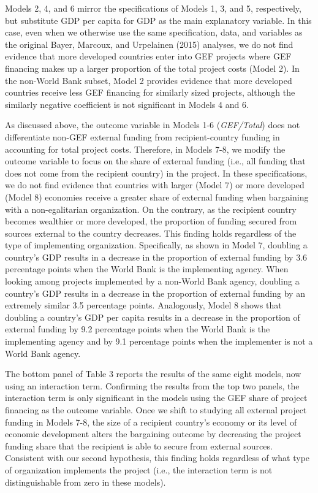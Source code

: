 \documentclass{article}
\begin{document}
Models 2, 4, and 6 mirror the specifications of Models 1, 3, and 5, respectively, but substitute GDP per capita for GDP as the main explanatory variable.  In this case, even when we otherwise use the same specification, data, and variables as the original Bayer, Marcoux, and Urpelainen (2015) analyses, we do not find evidence that more developed countries enter into GEF projects where GEF financing makes up a larger proportion of the total project costs (Model 2).  In the non-World Bank subset, Model 2 provides evidence that more developed countries receive less GEF financing for similarly sized projects, although the similarly negative coefficient is not significant in Models 4 and 6. 

As discussed above, the outcome variable in Models 1-6 (\textit{GEF/Total}) does not differentiate non-GEF external funding from recipient-country funding in accounting for total project costs.  Therefore, in Models 7-8, we modify the outcome variable to focus on the share of external funding (i.e., all funding that does not come from the recipient country) in the project.  In these specifications, we do not find evidence that countries with larger (Model 7) or more developed (Model 8) economies receive a greater share of external funding when bargaining with a non-egalitarian organization.  On the contrary, as the recipient country becomes wealthier or more developed, the proportion of funding secured from sources external to the country decreases.  This finding holds regardless of the type of implementing organization.  Specifically, as shown in Model 7, doubling a country’s GDP results in a decrease in the proportion of external funding by 3.6 percentage points when the World Bank is the implementing agency. When looking among projects implemented by a non-World Bank agency, doubling a country’s GDP results in a decrease in the proportion of external funding by an extremely similar 3.5 percentage points.  Analogously, Model 8 shows that doubling a country’s GDP per capita results in a decrease in the proportion of external funding by 9.2 percentage points when the World Bank is the implementing agency and by 9.1 percentage points when the implementer is not a World Bank agency.  

The bottom panel of Table 3 reports the results of the same eight models, now using an interaction term.  Confirming the results from the top two panels, the interaction term is only significant in the models using the GEF share of project financing as the outcome variable.  Once we shift to studying all external project funding in Models 7-8, the size of a recipient country’s economy or its level of economic development alters the bargaining outcome by decreasing the project funding share that the recipient is able to secure from external sources.  Consistent with our second hypothesis, this finding holds regardless of what type of organization implements the project (i.e., the interaction term is not distinguishable from zero in these models).  
\end{document}
